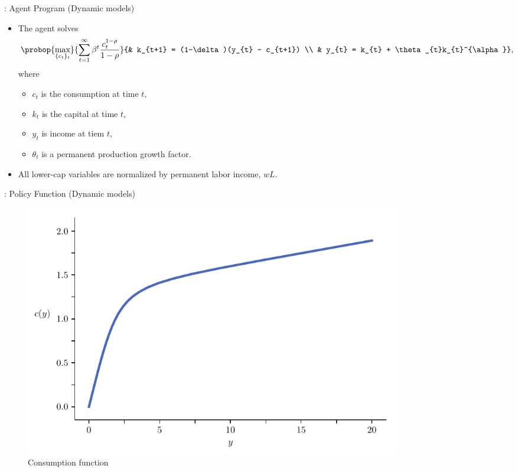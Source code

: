 \documentclass[10pt, handout]{beamer}
\begin{document}
\begin{frame}[label=Carroll-Program, plain, noframenumbering]{\secname: Agent Program (Dynamic models) \hyperlink{Carroll-Model}{\beamerreturnbutton}}
	\vfill
	\begin{itemize}
		\item The agent solves \vspace{2ex}
				$$\probop{\max_{\{c_{t}\}_{t}}}{\sum_{t=1}^{\infty} \beta^{t}\frac{c_{t}^{1-\rho}}{1-\rho}}
					{&	k_{t+1} = (1-\delta)(y_{t} - c_{t+1})	\\
					&	y_{t} = k_{t} + \theta_{t}k_{t}^{\alpha}},$$
			where \vspace{1ex}
			\begin{itemize}
				\item $c_{t}$ is the consumption at time $t$, \vspace{1ex}
				\item $k_{t}$ is the capital at time $t$, \vspace{1ex}
				\item $y_{t}$ is income at tiem $t$, \vspace{1ex}
				\item $\theta_{t}$ is a permanent production growth factor. 
			\end{itemize} \vfill
			
		\item All lower-cap variables are normalized by permanent labor income, $wL$.
	\end{itemize}

\end{frame}

\begin{frame}[label=Carroll-Consumption, plain, noframenumbering]{\secname: Policy Function (Dynamic models) \hyperlink{Carroll-Model}{\beamerreturnbutton}}
	\begin{figure}[H]
		\caption{Consumption function}
		\label{fig:concaveC}
		\includegraphics[width=0.8\textwidth]{CarrollCons}
	\end{figure}
\end{frame}
\end{document}
